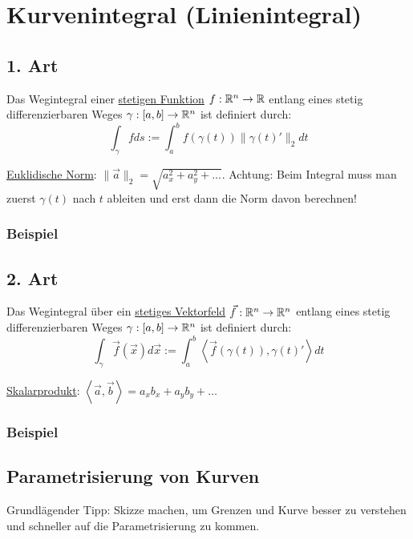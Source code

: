 \section{Kurvenintegral (Linienintegral)}
\subsection{1. Art}
Das Wegintegral einer \underline{stetigen Funktion} $f: \mathbb{R}^n \to \mathbb{R}$ entlang
eines stetig differenzierbaren Weges $\gamma: [a,b] \to \mathbb{R}^n$ ist definiert durch:
\[
\int_\gamma f ds := \int_a^b f(\gamma(t)) \|\gamma(t)'\|_2 dt
\]

\underline{Euklidische Norm}: $\|\vec{a}\|_2 = \sqrt{a_x^2 + a_y^2 + \ldots}$.
Achtung: Beim Integral muss man zuerst $\gamma(t)$ nach $t$ ableiten und erst
dann die Norm davon berechnen!

\subsubsection{Beispiel}
\todo{\ldots}

\subsection{2. Art}
Das Wegintegral über ein \underline{stetiges Vektorfeld} $\vec{f}: \mathbb{R}^n \to \mathbb{R}^n$
entlang eines stetig differenzierbaren Weges $\gamma: [a,b] \to \mathbb{R}^n$ ist definiert
durch:
\[
\int_\gamma \vec{f}(\vec{x}) d\vec{x} := \int_a^b \left< \vec{f}(\gamma(t)), \gamma(t)' \right> dt
\]

\underline{Skalarprodukt}: $\left< \vec{a}, \vec{b} \right> = a_x b_x + a_y b_y + \ldots$

\subsubsection{Beispiel}
\todo{\ldots}

\subsection{Parametrisierung von Kurven}
Grundlägender Tipp: Skizze machen, um Grenzen und Kurve besser zu verstehen und
schneller auf die Parametrisierung zu kommen.

